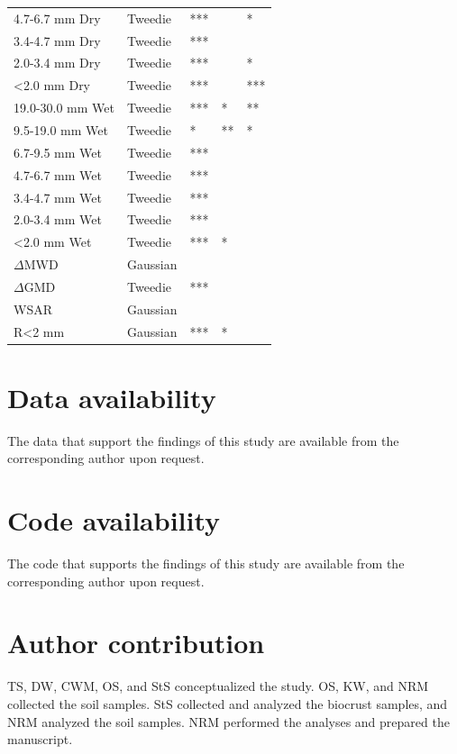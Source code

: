 {\begin{table}[htbp]
\begin{tabular}{@{}lllll@{}}
4.7-6.7 mm Dry	& Tweedie	& ***	& 	& * \\
3.4-4.7 mm Dry	& Tweedie	& ***	& 	&  \\
2.0-3.4 mm Dry	& Tweedie	& ***	& 	& * \\
\textless2.0 mm Dry	& Tweedie	& ***	& 	& *** \\ %
19.0-30.0 mm Wet	& Tweedie	& ***	& *	& ** \\
9.5-19.0 mm Wet	& Tweedie	& *	& **	& * \\
6.7-9.5 mm Wet	& Tweedie	& ***	& 	&  \\
4.7-6.7 mm Wet	& Tweedie	& ***	& 	&  \\
3.4-4.7 mm Wet	& Tweedie	& ***	& 	&  \\
2.0-3.4 mm Wet	& Tweedie	& ***	& 	&  \\
\textless2.0 mm Wet	& Tweedie	& ***	& *	&  \\ %
$\Delta$MWD	& Gaussian	& 	& 	&  \\ %
$\Delta$GMD	& Tweedie	& ***	& 	&  \\ %
WSAR	& Gaussian	& 	& 	&  \\
R\textless2 mm	& Gaussian	& ***	& *	&  \\ %
\bottomrule
\end{tabular}
\end{table}

\FloatBarrier

\section*{Data availability}

The data that support the findings of this study are available from the corresponding author upon request.

\section*{Code availability}

The code that supports the findings of this study are available from the corresponding author upon request.

\section*{Author contribution}

TS, DW, CWM, OS, and StS conceptualized the study. OS, KW, and NRM collected the soil samples. StS collected and analyzed the biocrust samples, and NRM analyzed the soil samples. NRM performed the analyses and prepared the manuscript.

}
